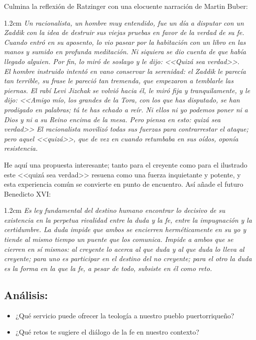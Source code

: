 \documentclass[10pt]{article}
\newcommand{\citalitlar}[1]{
\begin{adjustwidth}{1.2cm}{}
\emph{#1}
\end{adjustwidth}
}
\begin{document}
Culmina la reflexión de Ratzinger con una elocuente narración de Martin Buber:
\citalitlar{Un racionalista, un hombre muy entendido, fue un día a disputar
  con un Zaddik con la idea de destruir sus viejas pruebas en favor de la
  verdad de su fe. Cuando entró en su aposento, lo vio pasear por la
  habitación con un libro en las manos y sumido en profunda meditación. Ni
  siquiera se dio cuenta de que había
  llegado alguien. Por fin, lo miró de soslayo y le dijo: <<Quizá sea verdad>>.\\
  El hombre instruido intentó en vano conservar la serenidad: el Zaddik le
  parecía tan terrible, su frase le pareció tan tremenda, que empezaron a
  temblarle las piernas. El rabí Levi Jizchak se volvió hacia él, le miró fija
  y tranquilamente, y le dijo: <<Amigo mío, los grandes de la Tora, con los
  que has disputado, se han prodigado en palabras; tú te has echado a reír. Ni
  ellos ni yo podemos poner ni a Dios y ni a su Reino encima de la mesa. Pero
  piensa en esto: quizá sea verdad>> El racionalista movilizó todas sus
  fuerzas para contrarrestar el ataque; pero aquel <<quizá>>, que de vez en
  cuando retumbaba en sus oídos, oponía resistencia.}

He aquí una propuesta interesante; tanto para el creyente como para el
ilustrado este <<quizá sea verdad>> resuena como una fuerza inquietante y
potente, y esta experiencia común se convierte en punto de encuentro. Así
añade el futuro Benedicto XVI:
\citalitlar{Es ley fundamental del destino humano encontrar lo decisivo de su
  existencia en la perpetua rivalidad entre la duda y la fe, entre la
  impugnación y la certidumbre. La duda impide que ambos se encierren
  herméticamente en su yo y tiende al mismo tiempo un puente que los comunica.
  Impide a ambos que se cierren en sí mismos: al creyente lo acerca al que duda
  y al que duda lo lleva al creyente; para uno es participar en el destino del
  no creyente; para el otro la duda es la forma en la que la fe, a pesar de
  todo, subsiste en él como reto.}

\subsection{Análisis:}
\begin{itemize}
  \item ¿Qué servicio puede ofrecer la teología a nuestro pueblo puertorriqueño?
  \item ¿Qué retos te sugiere el diálogo de la fe en nuestro contexto?
\end{itemize}
\newpage
\end{document}
